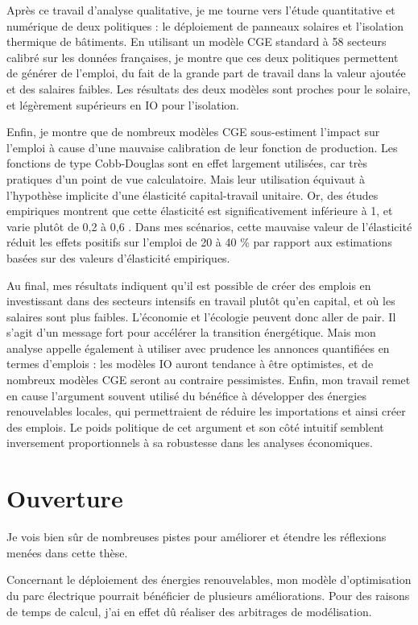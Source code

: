 Après ce travail d'analyse qualitative, je me tourne vers l'étude quantitative et numérique de deux politiques : le déploiement de panneaux solaires et l'isolation thermique de bâtiments. 
En utilisant un modèle CGE standard à 58 secteurs calibré sur les données françaises, je montre que ces deux politiques permettent de générer de l'emploi, du fait de la grande part de travail dans la valeur ajoutée et des salaires faibles. Les résultats des deux modèles sont proches pour le solaire, et légèrement supérieurs en IO pour l'isolation.

Enfin, je montre que de nombreux modèles CGE sous-estiment l’impact sur l’emploi à cause d'une mauvaise calibration de leur fonction de production. Les fonctions de type Cobb-Douglas sont en effet largement utilisées, car très pratiques d’un point de vue calculatoire. Mais leur utilisation équivaut à l'hypothèse implicite d’une élasticité capital-travail unitaire. Or, des études empiriques montrent que cette élasticité est significativement inférieure à 1, et varie plutôt de 0,2 à 0,6 \citep{VanderWerf2008}. Dans mes scénarios, cette mauvaise valeur de l’élasticité réduit les effets positifs sur l’emploi de 20 à 40 \% par rapport aux estimations basées sur des valeurs d'élasticité empiriques. 

Au final, mes résultats indiquent qu’il est possible de créer des emplois en investissant dans des secteurs intensifs en travail plutôt qu’en capital, et où les salaires sont plus faibles. L'économie et l'écologie peuvent donc aller de pair. Il s’agit d’un message fort pour accélérer la transition énergétique.
Mais mon analyse appelle également à utiliser avec prudence les annonces quantifiées en termes d’emplois : les modèles IO auront tendance à être optimistes, et de nombreux modèles CGE seront au contraire pessimistes.
Enfin, mon travail remet en cause l’argument souvent utilisé du bénéfice à développer des énergies renouvelables locales, qui permettraient de réduire les importations et ainsi créer des emplois. Le poids politique de cet argument et son côté intuitif semblent inversement proportionnels à sa robustesse dans les analyses économiques.


\section{Ouverture}

Je vois bien sûr de nombreuses pistes pour améliorer et étendre les réflexions menées dans cette thèse. 

Concernant le déploiement des énergies renouvelables, mon modèle d'optimisation du parc électrique pourrait bénéficier de plusieurs améliorations. Pour des raisons de temps de calcul, j’ai en effet dû réaliser des arbitrages de modélisation. 

